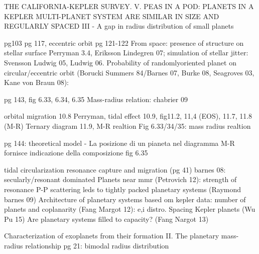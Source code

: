 \begin{workout}
THE CALIFORNIA-KEPLER SURVEY. V. PEAS IN A POD: PLANETS IN A KEPLER MULTI-PLANET SYSTEM ARE SIMILAR IN SIZE AND REGULARLY SPACED
III - A gap in radius distribution of small planets
\end{workout}

\begin{workout}
pg103
pg 117, eccentric orbit pg 121-122
From space: presence of structure on stellar surface Perryman 3.4, Eriksson Lindegren 07; simulation of stellar jitter: Svensson Ludwig 05, Ludwig 06.
Probability of randomlyoriented planet on circular/eccentric orbit (Borucki Summers 84/Barnes 07, Burke 08,  Seagroves 03, Kane von Braun 08):
\end{workout}

\begin{workout}
pg 143, fig 6.33, 6.34, 6.35
Mass-radius relation: chabrier 09
\end{workout}

\begin{workout}[M-R diagram]
orbital migration 10.8 Perryman, tidal effect 10.9, 
fig11.2, 11,4 (EOS), 11.7, 11.8 (M-R)
Ternary diagram 11.9, M-R realtion
Fig 6.33/34/35: mass radius realtion

pg 144: theoretical model - La posizione di un pianeta nel diagramma M-R fornisce indicazione della composizione
fig 6.35
\end{workout}

\begin{workout}
\end{workout}

\begin{workout}
tidal circularization
resonance capture and migration (pg 41)
barnes 08: secularly/resonant dominated
Planets near mmr (Petrovich 12): strength of resonance
P-P scattering leds to tightly packed planetary systems (Raymond barnes 09)
Architecture of planetary systems based om kepler data: number of planets and coplanarity (Fang Margot 12): e,i distro.
Spacing Kepler planets (Wu Pu 15)
Are planetary systems filled to capacity? (Fang Nargot 13)
\end{workout}

\begin{workout}
	Characterization of exoplanets from their formation II. The planetary mass-radius relationship pg 21: bimodal radius distribution
\end{workout}

